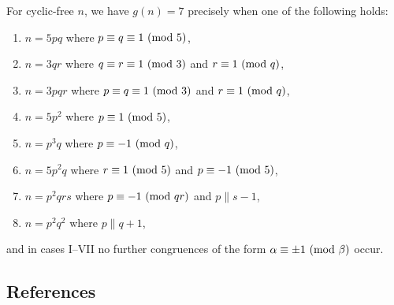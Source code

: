 \begin{thm}
	For cyclic-free $n$, we have $g(n) = 7$ precisely when one of the following holds:
	\begin{enumerate}	\listspace
		\item $n = 5pq$ where $p \equiv q \equiv 1 \ (\mathrm{mod} \ 5)$,
		\item $n = 3qr$ where $q \equiv r \equiv 1 \ (\mathrm{mod} \ 3)$ and $r \equiv 1 \ (\mathrm{mod} \ q)$,
		\item $n = 3pqr$ where $p \equiv q \equiv 1 \ (\mathrm{mod} \ 3)$ and $r \equiv 1 \ (\mathrm{mod} \ q)$,
		\item $n = 5p^2$ where $p \equiv 1 \ (\mathrm{mod} \ 5)$,
		\item $n = p^3 q$ where $p \equiv -1 \ (\mathrm{mod} \ q)$,
		\item $n = 5p^2 q$ where $r \equiv 1 \ (\mathrm{mod} \ 5)$ and $p \equiv -1 \ (\mathrm{mod} \ 5)$,
		\item $n = p^2 q r s$ where $p \equiv -1 \ (\mathrm{mod} \ qr)$ and $p \parallel s - 1$,
		\item $n = p^2 q^2$ where $p \parallel q + 1$,
	\end{enumerate} \textspace
	and in cases I--VII no further congruences of the form $\alpha \equiv \pm 1 \ (\mathrm{mod} \ \beta)$ \nolinebreak[4] \mbox{occur}.
\end{thm}

\begin{center}\section*{References}\end{center}
\printbibliography[heading=none]

